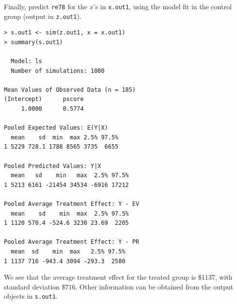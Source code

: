 \documentclass[oneside,letterpaper,titlepage]{article}
\begin{document}
Finally, predict {\tt re78} for the $x$'s in {\tt x.out1}, using the
model fit in the control group (output in {\tt z.out1}).

\begin{verbatim}
> s.out1 <- sim(z.out1, x = x.out1)
> summary(s.out1)

  Model: ls 
  Number of simulations: 1000 

Mean Values of Observed Data (n = 185) 
(Intercept)      pscore 
     1.0000      0.5774 

Pooled Expected Values: E(Y|X)
  mean    sd  min  max 2.5% 97.5%
1 5229 728.1 1788 8565 3735  6655

Pooled Predicted Values: Y|X
  mean   sd    min   max  2.5% 97.5%
1 5213 6161 -21454 34534 -6916 17212

Pooled Average Treatment Effect: Y - EV
  mean    sd    min  max  2.5% 97.5%
1 1120 570.4 -524.6 3230 23.69  2205

Pooled Average Treatment Effect: Y - PR
  mean  sd    min  max   2.5% 97.5%
1 1137 716 -943.4 3094 -293.3  2580
\end{verbatim}

We see that the average treatment effect for the treated group is
$\$1137$, with standard deviation $\$716$.  Other information can be
obtained from the output objects in {\tt s.out1}.
\end{document}
